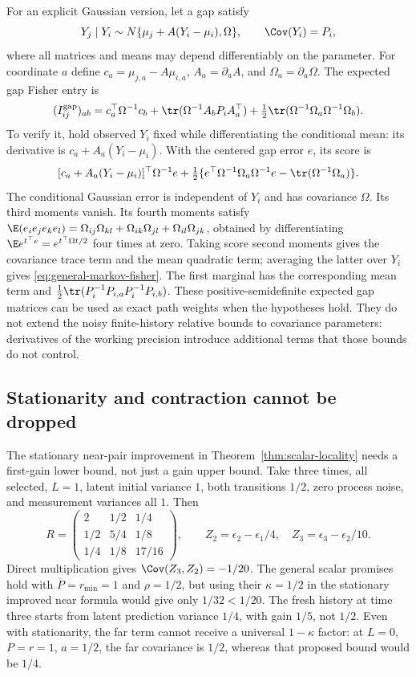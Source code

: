 For an explicit Gaussian version, let a gap satisfy
\[
 Y_j\mid Y_i\sim N\{\mu_j+A(Y_i-\mu_i),\Omega\},\qquad
 \Cov(Y_i)=P_i,
\]
where all matrices and means may depend differentiably on the parameter.
For coordinate $a$ define
$c_a=\mu_{j,a}-A\mu_{i,a}$, $A_a=\partial_a A$, and
$\Omega_a=\partial_a\Omega$. The expected gap Fisher entry is
\begin{equation}
 (I_{ij}^{\mathrm{gap}})_{ab}
 =c_a^\top\Omega^{-1}c_b
  +\tr(\Omega^{-1}A_bP_iA_a^\top)
  +\tfrac12\tr(\Omega^{-1}\Omega_a\Omega^{-1}\Omega_b).
 \label{eq:general-markov-fisher}
\end{equation}
To verify it, hold observed $Y_i$ fixed while differentiating the conditional
mean: its derivative is $c_a+A_a(Y_i-\mu_i)$. With the centered gap error
$e$, its score is
\[
 [c_a+A_a(Y_i-\mu_i)]^\top\Omega^{-1}e
 +\tfrac12\{e^\top\Omega^{-1}\Omega_a\Omega^{-1}e
                -\tr(\Omega^{-1}\Omega_a)\}.
\]
The conditional Gaussian error is independent of $Y_i$ and has covariance
$\Omega$. Its third moments vanish. Its fourth moments satisfy
$\E(e_i e_j e_k e_l)=\Omega_{ij}\Omega_{kl}
+\Omega_{ik}\Omega_{jl}+\Omega_{il}\Omega_{jk}$, obtained by differentiating
$\E e^{t^\top e}=e^{t^\top\Omega t/2}$ four times at zero.
Taking score second moments gives the covariance trace term and the mean
quadratic term; averaging the latter over $Y_i$ gives
\eqref{eq:general-markov-fisher}. The first marginal has the corresponding
mean term and $\tfrac12\tr(P_i^{-1}P_{i,a}P_i^{-1}P_{i,b})$.
These positive-semidefinite expected gap matrices can be used as exact
path weights when the hypotheses hold. They do not extend the noisy
finite-history relative bounds to covariance parameters: derivatives of the
working precision introduce additional terms that those bounds do not control.

\subsection{Stationarity and contraction cannot be dropped}
\label{app:locality-boundaries}
The stationary near-pair improvement in Theorem~\ref{thm:scalar-locality}
needs a first-gain lower bound, not just a gain upper bound.
Take three times, all selected, $L=1$, latent initial variance $1$, both
transitions $1/2$, zero process noise, and measurement variances all $1$.
Then
\[
 R=\begin{pmatrix}2&1/2&1/4\\1/2&5/4&1/8\\1/4&1/8&17/16\end{pmatrix},
 \qquad Z_2=\epsilon_2-\epsilon_1/4,\quad
 Z_3=\epsilon_3-\epsilon_2/10.
\]
Direct multiplication gives $\Cov(Z_3,Z_2)=-1/20$.
The general scalar promises hold with $\overline P=r_{\min}=1$ and
$\rho=1/2$, but using their $\kappa=1/2$ in the stationary improved
near formula would give only $1/32<1/20$. The fresh history at time three
starts from latent prediction variance $1/4$, with gain $1/5$, not $1/2$.
Even with stationarity, the far term cannot receive a universal
$1-\kappa$ factor: at $L=0$, $P=r=1$, $a=1/2$, the far covariance is
$1/2$, whereas that proposed bound would be $1/4$.

